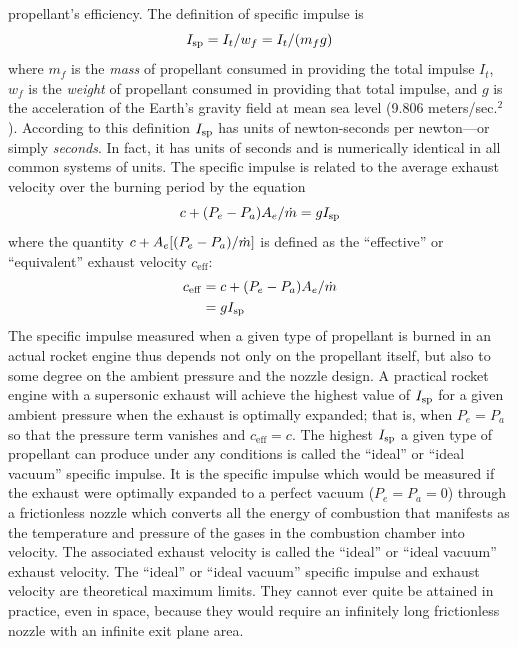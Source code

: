 propellant's efficiency. The definition of specific impulse is
\begin{equation}\label{ch1:eq:5}
I_{\mathrm{sp}} = I_t/w_f = I_t/(m_f g)
\end{equation}
where $m_f$ is the \emph{mass} of propellant consumed in providing the total impulse $I_t$, $w_f$
is the \emph{weight} of propellant consumed in providing that total impulse, and $g$ is the
acceleration of the Earth's gravity field at mean sea level (9.806 meters/sec.$^{2}$). According
to this definition $I_{\mathrm{sp}}$ has units of newton-seconds per newton---or simply \emph{seconds}. In
fact, it has units of seconds and is numerically identical in all common systems of units. The
specific impulse is related to the average exhaust velocity over the burning period by the
equation
\begin{equation}\label{ch1:eq:6}
c + (P_e - P_a)A_e/\dot{m} = gI_{\mathrm{sp}}
\end{equation}
where the quantity $c + A_e[(P_e - P_a)/\dot{m}]$ is defined as the ``effective'' or ``equivalent''
exhaust velocity $c_{\mathrm{eff}}$:
\begin{equation}\label{ch1:eq:7}
\begin{split}
c_{\mathrm{eff}} &= c + (P_e - P_a)A_e/\dot{m}\\
&= gI_{\mathrm{sp}}
\end{split}
\end{equation}
The specific impulse measured when a given type of propellant is burned in an actual rocket
engine thus depends not only on the propellant itself, but also to some degree on the ambient
pressure and the nozzle design. A practical rocket engine with a supersonic exhaust will achieve
the highest value of $I_{\mathrm{sp}}$ for a given ambient pressure when the exhaust is optimally expanded;
that is, when $P_e = P_a$ so that the pressure term vanishes and $c_{\mathrm{eff}} = c$. The
highest $I_{\mathrm{sp}}$ a given type of propellant can produce under any conditions is called the
``ideal'' or ``ideal vacuum'' specific impulse. It is the specific impulse which would be measured
if the exhaust were optimally expanded to a perfect vacuum ($P_e = P_a = 0$) through a
frictionless nozzle which converts all the energy of combustion that manifests as the temperature
and pressure of the gases in the combustion chamber into velocity. The associated exhaust
velocity is called the ``ideal'' or ``ideal vacuum'' exhaust velocity. The ``ideal'' or ``ideal
vacuum'' specific impulse and exhaust velocity are theoretical maximum limits. They cannot ever
quite be attained in practice, even in space, because they would require an infinitely long
frictionless nozzle with an infinite exit plane area.

